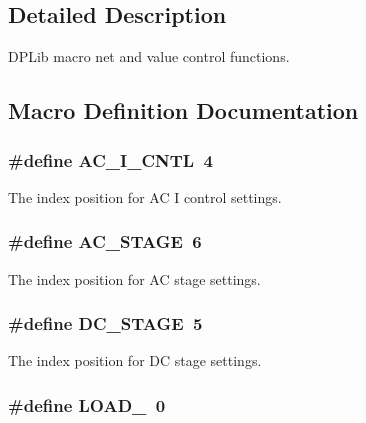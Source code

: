 \subsection{Detailed Description}
D\-P\-Lib macro net and value control functions. 

\subsection{Macro Definition Documentation}
\hypertarget{a00021_ab875424e7a295e6a0eae1605b3285adb}{
\subsubsection[{A\-C\-\_\-\-I\-\_\-\-C\-N\-T\-L}]{\setlength{\rightskip}{0pt plus 5cm}\#define A\-C\-\_\-\-I\-\_\-\-C\-N\-T\-L~4}}\label{a00021_ab875424e7a295e6a0eae1605b3285adb}
The index position for A\-C I control settings. \hypertarget{a00021_a3fc4318ae73eae35339f616047300b0f}{
\subsubsection[{A\-C\-\_\-\-S\-T\-A\-G\-E}]{\setlength{\rightskip}{0pt plus 5cm}\#define A\-C\-\_\-\-S\-T\-A\-G\-E~6}}\label{a00021_a3fc4318ae73eae35339f616047300b0f}
The index position for A\-C stage settings. \hypertarget{a00021_af3967a451ed4068ca1cbf55dd2de3799}{
\subsubsection[{D\-C\-\_\-\-S\-T\-A\-G\-E}]{\setlength{\rightskip}{0pt plus 5cm}\#define D\-C\-\_\-\-S\-T\-A\-G\-E~5}}\label{a00021_af3967a451ed4068ca1cbf55dd2de3799}
The index position for D\-C stage settings. \hypertarget{a00021_a007a209cd2e2b935be1f69218652edc1}{
\subsubsection[{L\-O\-A\-D\-\_\-0}]{\setlength{\rightskip}{0pt plus 5cm}\#define L\-O\-A\-D\-\_~0}}\label{a00021_a007a209cd2e2b935be1f69218652edc1}
